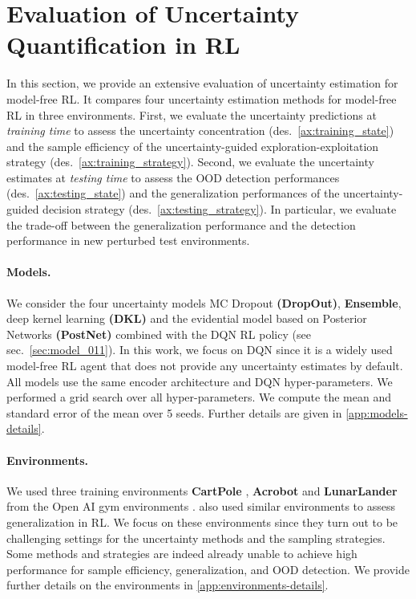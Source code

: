 \vspace{-3mm}
\section{Evaluation of Uncertainty Quantification in RL}
\label{sec:experiments_011}

In this section, we provide an extensive evaluation of uncertainty estimation for model-free RL. It compares four uncertainty estimation methods for model-free RL in three environments. First, we evaluate the uncertainty predictions at \emph{training time} to assess the uncertainty concentration (des.~\ref{ax:training_state}) and the sample efficiency of the uncertainty-guided exploration-exploitation strategy (des.~\ref{ax:training_strategy}). Second, we evaluate the uncertainty estimates at \emph{testing time} to assess the OOD detection performances (des.~\ref{ax:testing_state}) and the generalization performances of the uncertainty-guided decision strategy (des.~\ref{ax:testing_strategy}). In particular, we evaluate the trade-off between the generalization performance and the detection performance in new perturbed test environments.

\paragraph{Models.} We consider the four uncertainty models MC Dropout \textbf{(DropOut)}, \textbf{Ensemble}, deep kernel learning \textbf{(DKL)} and the evidential model based on Posterior Networks \textbf{(PostNet)} combined with the DQN RL policy (see sec.~\ref{sec:model_011}). In this work, we focus on DQN \citep{dqn} since it is a widely used model-free RL agent that does not provide any uncertainty estimates by default. All models use the same encoder architecture and DQN hyper-parameters. We performed a grid search over all hyper-parameters. We compute the mean and standard error of the mean over 5 seeds. Further details are given in \cref{app:models-details}.

\paragraph{Environments.} We used three training environments \textbf{CartPole} \citep{cartpole}, \textbf{Acrobot} \citep{acrobot1, acrobot2} and \textbf{LunarLander} \citep{lunarlander1} from the Open AI gym environments \citep{gym}. \citet{assessing-generalization-rl} also used similar environments to assess generalization in RL. We focus on these environments since they turn out to be challenging settings for the uncertainty methods and the sampling strategies. Some methods and strategies are indeed already unable to achieve high performance for sample efficiency, generalization, and OOD detection. We provide further details on the environments in \cref{app:environments-details}. 

